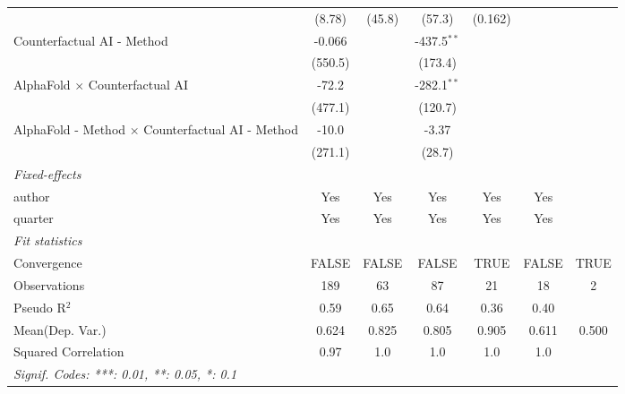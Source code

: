 \begin{tabular}{lcccccc}
                                                           & (8.78)   & (45.8)        & (57.3)        & (0.162) &              &   \\   
   Counterfactual AI - Method                              & -0.066   &               & -437.5$^{**}$ &         &              &   \\   
                                                           & (550.5)  &               & (173.4)       &         &              &   \\   
   AlphaFold $\times$ Counterfactual AI                    & -72.2    &               & -282.1$^{**}$ &         &              &   \\   
                                                           & (477.1)  &               & (120.7)       &         &              &   \\   
   AlphaFold - Method $\times$ Counterfactual AI - Method  & -10.0    &               & -3.37         &         &              &   \\   
                                                           & (271.1)  &               & (28.7)        &         &              &   \\   
   \midrule
   \emph{Fixed-effects}\\
   author                                                  & Yes      & Yes           & Yes           & Yes     & Yes          & \\  
   quarter                                                 & Yes      & Yes           & Yes           & Yes     & Yes          & \\  
   \midrule
   \emph{Fit statistics}\\
   Convergence                                             &FALSE     & FALSE         & FALSE         & TRUE    & FALSE        & TRUE\\  
   Observations                                            & 189      & 63            & 87            & 21      & 18           & 2\\  
   Pseudo R$^2$                                            & 0.59     & 0.65          & 0.64          & 0.36    & 0.40         & \\  
Mean(Dep. Var.) & 0.624 & 0.825 & 0.805 & 0.905 & 0.611 & 0.500 \\
   Squared Correlation                                     & 0.97     & 1.0           & 1.0           & 1.0     & 1.0          & \\  
   \midrule \midrule
   \multicolumn{7}{l}{\emph{Signif. Codes: ***: 0.01, **: 0.05, *: 0.1}}\\
\end{tabular}
\par\endgroup
